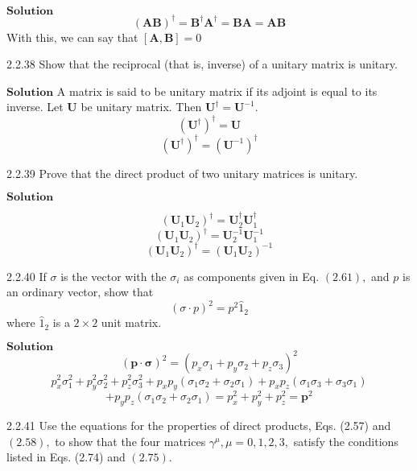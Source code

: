 \documentclass{article}
\begin{document}
\begin{flushleft}
$\boxed{\textbf{Solution}}$ 
$$(\mathbf{A}\mathbf{B})^{\dagger}=\mathbf{B}^{\dagger} \mathbf{A}^{\dagger}=\mathbf{B} \mathbf{A}=\mathbf{AB}$$
With this, we can say that $[\mathbf{A}, \mathbf{B}] = 0$

\newpage

\begin{mybox}{2.2.38}
Show that the reciprocal (that is, inverse) of a unitary matrix is unitary.
\end{mybox}


$\boxed{\textbf{Solution}}$ A matrix is said to be unitary matrix if its adjoint is equal to its inverse. Let $\mathbf{U}$ be unitary matrix. Then $\mathbf{U}^{\dagger}=\mathbf{U}^{-1}$.
$$\left( \mathbf{U}^{\dagger}\right)^{\dagger}=\mathbf{U}$$
$$\left( \mathbf{U}^{\dagger}\right)^{\dagger}=\left( \mathbf{U}^{-1}\right)^{\dagger}$$

\newpage

\begin{mybox}{2.2.39}
Prove that the direct product of two unitary matrices is unitary.
\end{mybox}

$\boxed{\textbf{Solution}}$ 

$$\left( \mathbf{U}_{1}  \mathbf{U}_{2}\right)^{\dagger}= \mathbf{U}_{2}^{\dagger}  \mathbf{U}_{1}^{\dagger}$$
$$\left( \mathbf{U}_{1}  \mathbf{U}_{2}\right)^{\dagger}= \mathbf{U}_{2}^{-1}  \mathbf{U}_{1}^{-1}$$
$$\left( \mathbf{U}_{1}  \mathbf{U}_{2}\right)^{\dagger}=\left( \mathbf{U}_{1}  \mathbf{U}_{2}\right)^{-1}$$

\newpage

\begin{mybox}{2.2.40}
If $\sigma$ is the vector with the $\sigma_{i}$ as components given in Eq. $(2.61),$ and $p$ is an ordinary vector, show that
$$(\sigma \cdot p)^{2}=p^{2} \hat{1}_{2}$$
where $\hat{1}_{2}$ is a $2 \times 2$ unit matrix.
\end{mybox}


$\boxed{\textbf{Solution}}$ 
$$(\mathbf{p} \cdot \boldsymbol{\sigma})^{2}=\left(p_{x} \sigma_{1}+p_{y} \sigma_{2}+p_{z} \sigma_{3}\right)^{2}$$
$$p_{x}^{2} \sigma_{1}^{2}+p_{y}^{2} \sigma_{2}^{2}+p_{z}^{2} \sigma_{3}^{2}+p_{x} p_{y}\left(\sigma_{1} \sigma_{2}+\sigma_{2} \sigma_{1}\right)+p_{x} p_{z}\left(\sigma_{1} \sigma_{3}+\sigma_{3} \sigma_{1}\right)$$
$$+p_{y} p_{z}\left(\sigma_{1} \sigma_{2}+\sigma_{2} \sigma_{1}\right)=p_{x}^{2}+p_{y}^{2}+p_{z}^{2}=\mathbf{p}^{2}$$

\newpage

\begin{mybox}{2.2.41}
Use the equations for the properties of direct products, Eqs. (2.57) and $(2.58),$ to show
that the four matrices $\gamma^{\mu}, \mu=0,1,2,3,$ satisfy the conditions listed in Eqs. (2.74) and $(2.75) .$
\end{mybox}



\end{flushleft}
\end{document}
